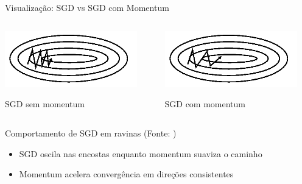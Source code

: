 \documentclass[aspectratio=1610]{beamer}
\begin{document}
\begin{frame}{Visualização: SGD vs SGD com Momentum}
\begin{columns}[T]
    \begin{column}{0.48\textwidth}
        \centering
        \includegraphics[width=0.9\textwidth]{figures/without_momentum.png}
        
        \small{SGD sem momentum}
    \end{column}
    \begin{column}{0.48\textwidth}
        \centering
        \includegraphics[width=0.9\textwidth]{figures/with_momentum.png}
        
        \small{SGD com momentum}
    \end{column}
\end{columns}

\vspace{0.3cm}
\begin{center}
\small{Comportamento de SGD em ravinas (Fonte: \cite{ruder2017})}
\end{center}

\begin{itemize}
    \item SGD oscila nas encostas enquanto momentum suaviza o caminho
    \item Momentum acelera convergência em direções consistentes
\end{itemize}
\end{frame}
\end{document}
